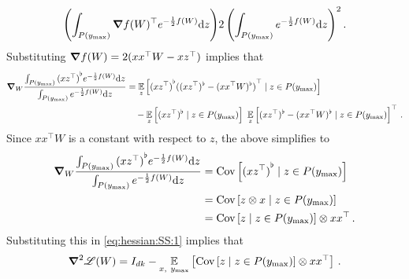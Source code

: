 \documentclass[11pt,letterpaper]{article}
\theoremstyle{plain}
\theoremstyle{definition}
\theoremstyle{remark}
\newcommand{\sinparen}[1]{\ensuremath{(#1)}}
\newcommand{\inparen}[1]{\ensuremath{\left(#1\right)}}
\newcommand{\insquare}[1]{\ensuremath{\left[#1\right]}}
\newcommand{\E}{\operatornamewithlimits{\mathbb{E}}}
\newcommand{\Ex}{\E}
\newcommand{\Cov}{\ensuremath{\operatornamewithlimits{\rm Cov}}}
\newcommand{\customcal}[1]{\euscr{#1}}
\newcommand{\cL}{\customcal{L}}
\newcommand{\negLL}{\ensuremath{\mathscr{L}}}
\renewcommand{\d}{{\rm d}}
\newcommand{\ymax}{y_{\max}}
\renewcommand{\cL}{\negLL}
\begin{document}
{{{\begin{align*}
{                \inparen{
                    \int_{P({\ymax})} \grad f(W)^\top e^{-\frac{1}{2}f(W)} \d z 
                }
           }{
                2\inparen{\int_{P({\ymax})} e^{-\frac{1}{2}f(W)} \d z }^2
           }
           \,.
        \end{align*}
        Substituting $\grad f(W) = 2(xx^\top W- xz^\top)$ implies that 
        \begin{align*}
           \grad_W \frac{
            \int_{P({\ymax})} {(xz^\top)}^\flat e^{-\frac{1}{2}f(W)} \d z 
           }{
            \int_{P({\ymax})} e^{-\frac{1}{2}f(W)} \d z 
           }
           &= 
           \Ex_z\insquare{{(xz^\top)}^\flat {\sinparen{(xz^\top)^\flat - (xx^\top W)^\flat}}^\top \mid z\in P({\ymax})}\\
           &\quad - \Ex_z\insquare{(xz^\top)^\flat \mid z\in P({\ymax})}
           ~\Ex_z\insquare{
                {(xz^\top)^\flat - (xx^\top W)^\flat}
                \mid z\in P({\ymax})
           }^\top\,.
        \end{align*}
        Since $xx^\top W$ is a constant with respect to $z$, the above simplifies to 
        \begin{align*}
            \grad_W \frac{
             \int_{P({\ymax})} {(xz^\top)}^\flat e^{-\frac{1}{2}f(W)} \d z 
            }{
             \int_{P({\ymax})} e^{-\frac{1}{2}f(W)} \d z 
            }
            &= \Cov\insquare{{(xz^\top)}^\flat\mid z\in P({\ymax})} \\
            &= \Cov\insquare{z\otimes x\mid z\in P({\ymax})} \\
            &= \Cov\insquare{z\mid z\in P({\ymax})}\otimes xx^\top
            \,.
        \end{align*}
        Substituting this in \cref{eq:hessian:SS:1} implies that 
        \[
            \grad^2 \cL(W) =  I_{dk} 
                - \Ex_{x,~\ymax}\insquare{\Cov\insquare{z\mid z\in P({\ymax})}\otimes xx^\top}\,.
        \]
         
    

        

    
    
}}}
\end{document}
